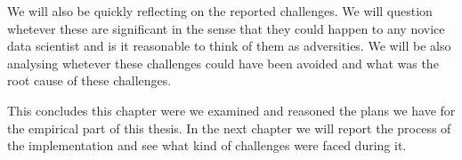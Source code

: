We will also be quickly reflecting on the reported challenges.
We will question whetever these are significant in the sense that they could happen to any novice data scientist and is it reasonable to think of them as adversities.
We will be also analysing whetever these challenges could have been avoided and what was the root cause of these challenges.

This concludes this chapter were we examined and reasoned the plans we have for the empirical part of this thesis.
In the next chapter we will report the process of the implementation and see what kind of challenges were faced during it.





